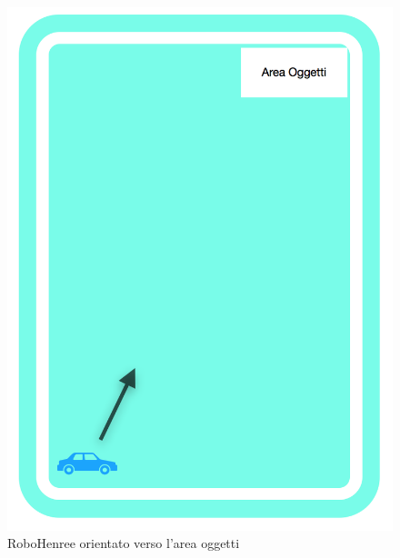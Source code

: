 \documentclass[a4paper,12pt,italian]{article}
\begin{document}
\begin{figure}[H]
	\begin{center}
	\includegraphics[scale=0.3]{movimento_2.png}
	\caption{RoboHenree orientato verso l'area oggetti}
	\label{Fig: movimento_2}
	\end{center}
\end{figure}
\end{document}
